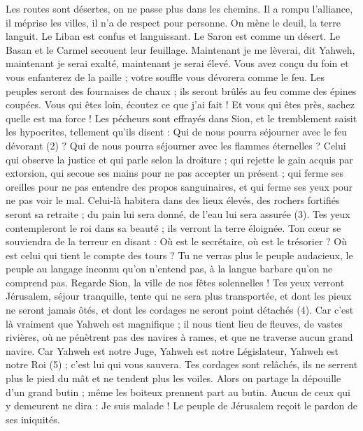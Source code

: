 \begin{multicols}{2}
Les routes sont désertes, on ne passe plus dans les chemins. Il a rompu l'alliance, il méprise les villes, il n’a de respect pour personne.
On mène le deuil, la terre languit. Le Liban est confus et languissant. Le Saron est comme un désert. Le Basan et le Carmel secouent leur feuillage.
Maintenant je me lèverai, dit Yahweh, maintenant je serai exalté, maintenant je serai élevé.
Vous avez conçu du foin et vous enfanterez de la paille ; votre souffle vous dévorera comme le feu.
Les peuples seront des fournaises de chaux ; ils seront brûlés au feu comme des épines coupées.
Vous qui êtes loin, écoutez ce que j'ai fait ! Et vous qui êtes près, sachez quelle est ma force !
Les pécheurs sont effrayés dans Sion, et le tremblement saisit les hypocrites, tellement qu'ils disent : Qui de nous pourra séjourner avec le feu dévorant (2) ? Qui de nous pourra séjourner avec les flammes éternelles ?
Celui qui observe la justice et qui parle selon la droiture ; qui rejette le gain acquis par extorsion, qui secoue ses mains pour ne pas accepter un présent ; qui ferme ses oreilles pour ne pas entendre des propos sanguinaires, et qui ferme ses yeux pour ne pas voir le mal.
Celui-là habitera dans des lieux élevés, des rochers fortifiés seront sa retraite ; du pain lui sera donné, de l’eau lui sera assurée (3).
Tes yeux contempleront le roi dans sa beauté ; ils verront la terre éloignée.
Ton cœur se souviendra de la terreur en disant : Où est le secrétaire, où est le trésorier ? Où est celui qui tient le compte des tours ?
Tu ne verras plus le peuple audacieux, le peuple au langage inconnu qu'on n'entend pas, à la langue barbare qu'on ne comprend pas.
Regarde Sion, la ville de nos fêtes solennelles ! Tes yeux verront Jérusalem, séjour tranquille, tente qui ne sera plus transportée, et dont les pieux ne seront jamais ôtés, et dont les cordages ne seront point détachés (4).
Car c'est là vraiment que Yahweh est magnifique ; il nous tient lieu de fleuves, de vastes rivières, où ne pénètrent pas des navires à rames, et que ne traverse aucun grand navire.
Car Yahweh est notre Juge, Yahweh est notre Législateur, Yahweh est notre Roi (5) ; c'est lui qui vous sauvera.
Tes cordages sont relâchés, ils ne serrent plus le pied du mât et ne tendent plus les voiles. Alors on partage la dépouille d'un grand butin ; même les boiteux prennent part au butin.
Aucun de ceux qui y demeurent ne dira : Je suis malade ! Le peuple de Jérusalem reçoit le pardon de ses iniquités.

\end{multicols}
